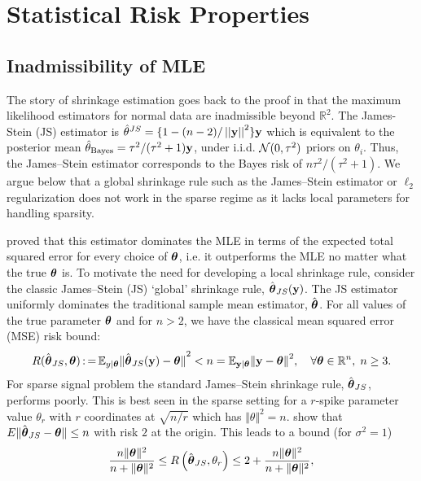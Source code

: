 \documentclass[sts,preprint]{imsart}
\begin{document}
\section{Statistical Risk Properties}\label{sec:stat-prop}

\subsection{Inadmissibility of MLE} 

The story of shrinkage estimation goes back to the proof in \citet{stein_inadmissibility_1956} that the maximum likelihood estimators for normal data are inadmissible beyond $\mathbb{R}^2$. The James-Stein (JS) estimator is $\hat{\theta}^{JS} = \{1 - (n-2)/\left|\left|{\bf y}\right|\right|^2 \} {\bf y}$ which is equivalent to the 
posterior mean $\hat{\theta}_{\mathrm{Bayes}} = \tau^2/(\tau^2+1){\bf y}$, under i.i.d. ${\cal N}(0,\tau^2)$ priors on $\theta_i$. Thus, the James--Stein estimator corresponds to the Bayes risk of $n{\tau^2}/({\tau^2+1})$.
We argue below that a global shrinkage rule such as the James--Stein estimator or $\ell_2$ regularization does not work in the sparse regime as it lacks local parameters for handling sparsity.


\citet{james_estimation_1961} proved that this estimator dominates the MLE in terms of the expected total squared error for every choice of $\boldsymbol{\theta}$, i.e. it outperforms the MLE no matter what the true $\boldsymbol{\theta}$ is. To motivate the need for developing a local shrinkage rule, consider the classic James--Stein (JS) `global' shrinkage rule, ${\hat{\boldsymbol{\theta}}}_{JS}{}({\bf y})$. The JS estimator uniformly dominates the traditional sample mean estimator, $\hat{\boldsymbol{\theta}}$. For all values of the true parameter $\boldsymbol{\theta}$ and for $n>2$, we have the classical mean squared error (MSE) risk bound:
\[ 
  R({\hat{\boldsymbol{\theta}}}_{JS}{}, \boldsymbol{\theta}) \operatorname{:=} \mathbb E_{y \mid \boldsymbol{\theta}} {\Vert {\hat{\boldsymbol{\theta}}}_{JS}{}({\bf y}) - \boldsymbol{\theta}
  \Vert}^2 < n = \mathbb E_{{\bf y} \mid \boldsymbol{\theta}} {\Vert {\bf y} - \boldsymbol{\theta} \Vert}^2, \quad
  \forall \boldsymbol{\theta} \in \mathbb{R}^n, \; n \ge 3.  
\]
For sparse signal problem the standard James--Stein shrinkage rule, ${\hat{\boldsymbol{\theta}}}_{JS}{}$, performs poorly. This is best seen in the sparse setting for a $r$-spike parameter value $ \theta_r$ with $r$ coordinates at $
\sqrt{n/r} $ which has $ \Vert \theta \Vert^2 =n $. \citet{johnstone2004needles} show that $E \Vert {\hat{\boldsymbol{\theta}}}_{JS}{} - \boldsymbol{\theta} \Vert \leq n $ with risk $2$ at the origin. This leads to a bound (for $\sigma^2 = 1$)
\[
  \frac{n \Vert \boldsymbol{\theta} \Vert^2}{ n + \Vert \boldsymbol{\theta} \Vert^2} \leq R \left (
  {\hat{\boldsymbol{\theta}}}_{JS}{}, \theta_r \right ) \leq 2 + \frac{n \Vert \boldsymbol{\theta} \Vert^2}{ n
  + \Vert \boldsymbol{\theta} \Vert^2},
\]
\end{document}
